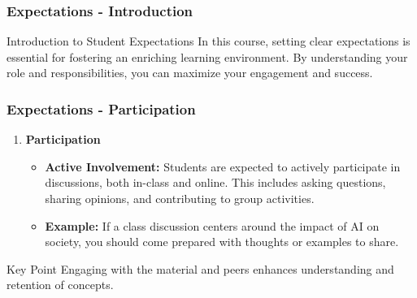 \documentclass[aspectratio=169]{beamer}
\begin{document}
\begin{frame}[fragile]
    \frametitle{Expectations - Introduction}
    \begin{block}{Introduction to Student Expectations}
        In this course, setting clear expectations is essential for fostering an enriching learning environment. 
        By understanding your role and responsibilities, you can maximize your engagement and success.
    \end{block}
\end{frame}

\begin{frame}[fragile]
    \frametitle{Expectations - Participation}
    \begin{enumerate}
        \item \textbf{Participation}
        \begin{itemize}
            \item \textbf{Active Involvement:} Students are expected to actively participate in discussions, both in-class and online. This includes asking questions, sharing opinions, and contributing to group activities.
            \item \textbf{Example:} If a class discussion centers around the impact of AI on society, you should come prepared with thoughts or examples to share.
        \end{itemize}
    \end{enumerate}
    \begin{block}{Key Point}
        Engaging with the material and peers enhances understanding and retention of concepts.
    \end{block}
\end{frame}
\end{document}

